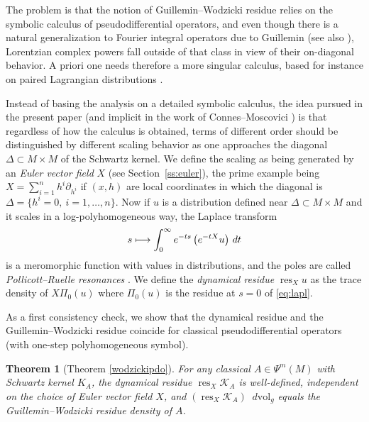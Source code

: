 \documentclass[JEP,XML,SOM,Unicode]{cedram}
\let\pazocal\mathscr
\def\mto{\mathchoice{\longmapsto}{\mapsto}{\mapsto}{\mapsto}}
\newtheorem{theorem}{Theorem}[section]
\theoremstyle{definition}
\let\euler X
\let\p\partial
\DeclareMathOperator*{\res}{res}
\renewcommand{\sec}[1]{Section~\ref{#1}}
\newcommand\dvol{\mathop{}\!d\mathrm{vol}}
\begin{document}
The problem is that the notion of Guillemin--Wodzicki residue relies on the symbolic calculus of pseudo\-differential operators, and even though there is a natural generalization to Fourier integral operators due to Guillemin \cite{Guillemin1993} (see also \cite{Hartung2015}), Lorentzian complex powers fall outside of that class in view of their on-diagonal behavior. A priori one needs therefore a more singular calculus, based for instance on paired Lagrangian distributions \cite{Guillemin1981,Melrose1979,Antoniano1985,Greenleaf1990,joshi,Joshi1998}.

Instead of basing the analysis on a detailed symbolic calculus, the idea pursued in the present paper (and implicit in the work of Connes--Moscovici \cite{Connes1995}) is that regardless of how the calculus is obtained, terms of different order should be distinguished by different scaling behavior as one approaches the diagonal $\Delta\subset M\times M$ of the Schwartz kernel. We define the scaling as being generated by an \emph{Euler vector field} $\euler$ (see \sec{ss:euler}), the prime example being $X=\sum_{i=1}^n h^i \p_{h^i}$ if $(x,h)$ are local coordinates in which the diagonal is $\Delta=\{h^{i}=0, \ i=1,\dots,n \}$. Now if $u$ is a distribution defined near $\Delta\subset M\times M$ and it scales in a log-polyhomogeneous way, the Laplace transform
\begin{equation}\label{eq:lapl}
s\mto \int_0^\infty e^{-ts} \left(e^{-t\euler}u\right) \,dt
\end{equation}
is a meromorphic function with values in distributions, and the poles are called \emph{Pollicott--Ruelle resonances} \cite{Pollicott1986,Ruelle1986}. We define the \emph{dynamical residue} $\res_X u$ as the trace density of $X \Pi_0(u)$ where $\Pi_0(u)$ is the residue at $s=0$ of \eqref{eq:lapl}.

As a first consistency check, we show that the dynamical residue and the Guillemin--Wodzicki residue coincide for classical pseudo\-differential operators (\ie with one-step polyhomogeneous symbol).

\begin{theorem}[{\cf Theorem \ref{wodzickipdo}}]\label{tthm1} For any classical $A\in \Psi^m(M)$ with Schwartz kernel $K_{A}$, the dynamical residue {$\res_X \pazocal{K}_{A}$} is well-defined, independent on the choice of Euler vector field $X$, and {$(\res_X \pazocal{K}_{A}) \dvol_g$} equals the Guillemin--Wodzicki residue density of $A$.
\end{theorem}
\end{document}
